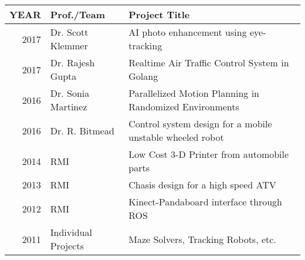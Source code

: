\documentclass[]{deedy-resume-openfont}
\begin{document}
\begin{minipage}[t]{0.66\textwidth}
\begin{tabular}{rll}
YEAR	     & Prof./Team  & Project Title \\
\hline
2017	     & Dr. Scott Klemmer & AI photo enhancement using eye-tracking\\
2017	     & Dr. Rajesh Gupta & Realtime Air Traffic Control System in Golang\\ 
2016         & Dr. Sonia Martinez & Parallelized Motion Planning in Randomized Environments\\
2016         &Dr. R. Bitmead & Control system design for a mobile unstable wheeled robot\\
2014	     & RMI  & Low Cost 3-D Printer from automobile parts\\
2013	     & RMI & Chasis design for a high speed ATV\\
2012	     & RMI & Kinect-Pandaboard interface through ROS\\
2011        &  Individual Projects & Maze Solvers, Tracking Robots, etc.\\
\end{tabular}
\sectionsep








\end{minipage} 
\end{document}
